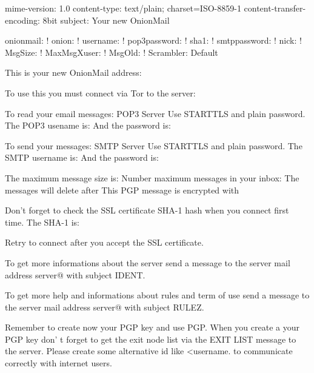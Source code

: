 mime-version: 1.0
content-type: text/plain; charset=ISO-8859-1
content-transfer-encoding: 8bit
subject: Your new OnionMail

onionmail: !
onion: !
username: !
pop3password: !
sha1: !
smtppassword: !
nick: !
MsgSize: !
MaxMsgXuser: !
MsgOld: !
Scrambler: Default
					
This is your new OnionMail address:

To use this you must connect via Tor to the server:

To read your email messages:
POP3 Server %
Use STARTTLS and plain password.
The POP3 usename is:
And the password is:

To send your messages:
SMTP Server %
Use STARTTLS and plain password.
The SMTP username is:
And the password is:

The maximum message size is: %
Number maximum messages in your inbox: %
The messages will delete after %
This PGP message is encrypted with %

Don't forget to check the SSL certificate SHA-1 hash when 
you connect first time. The SHA-1 is:

Retry to connect after you accept the SSL certificate.

To get more informations about the server send a message
to the server mail address server@%
with subject IDENT.

To get more help and informations about rules and term of
use send a message to the server mail address server@%
with subject RULEZ. 

Remember to create now your PGP key and use PGP.
When you create a your PGP key don' t forget to get the exit node list
via the EXIT LIST message to the server. Please create some alternative id
like <username.%
to communicate correctly with internet users.

